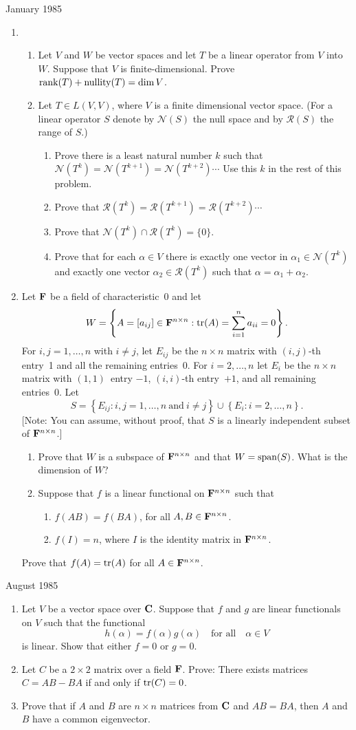 \documentclass[11pt]{amsart}
\renewcommand{\(}{\left(}
\renewcommand{\)}{\right)}
\renewcommand{\[}{\left[}
\renewcommand{\]}{\right]}
\newcommand{\cn}{\mbox{\bf C}}
\newcommand{\cd}{,\ldots,}
\newcommand{\tr}{\mathop{\rm Tr}}
\newcommand{\heading}[1]{\centerline{\large\sc #1}}
\newcommand{\num}{\begin{enumerate}}
\newcommand{\enum}{\end{enumerate}}
\newcommand{\fe}{{\bf F}}
\renewcommand{\tr}{\mathop{\rm tr}\nolimits}
\begin{document}
\heading{January 1985}
\num \item \num
\item Let $V$ and $W$ be vector spaces and let $T$ be a linear
operator from $V$ into $W$.  Suppose that $V$ is finite-dimensional.
Prove $\mathop{\rm rank}(T)+\mathop{\rm nullity}(T)=\dim V$.
\item  Let $T\in L(V,V)$, where $V$ is a finite dimensional vector space.
(For a linear operator $S$ denote by ${\mathcal N}(S)$ the null space and
by ${\mathcal R}(S)$ the range of $S$.)
\num
\item Prove there is a least natural number $k$ such that
${\mathcal N}(T^{k})= {\mathcal N}(T^{k+1})={\mathcal N}(T^{k+2})\cdots$  Use
this $k$ in the rest of this problem.
\item Prove that ${\mathcal R}(T^k)={\mathcal R}(T^{k+1})={\mathcal
R}(T^{k+2})\cdots$
\item Prove that ${\mathcal N}(T^k)\cap {\mathcal R}(T^k)=\{0\}$.
\item Prove that for each $\alpha\in V$ there is exactly one vector in
$\alpha_1\in{\mathcal N}(T^k)$ and exactly one vector $\alpha_2\in{\mathcal
R}(T^k)$ such that $\alpha=\alpha_1+\alpha_2$.
\enum
\enum
\item Let $\fe $ be a field of characteristic~0 and let 
$$
W=\left\{A=[a_{ij}]\in \fe^{n\times n}: \tr(A)=\sum_{i=1}^na_{ii}=0\right\}.
$$
For $i,j=1\cd n$ with $i\ne j$, let $E_{ij}$ be the $n\times n$ matrix
with $(i,j)$-th entry~1 and all the remaining entries~0.  For $i=2\cd
n$ let $E_{i}$ be the $n\times n$ matrix with $(1,1)$~entry $-1$,
$(i,i)$-th entry~$+1$, and all remaining entries~0.  Let
$$
S=\left\{E_{ij}: i,j=1\cd n\ \mbox{and}\ i\ne j\right\}\cup
\left\{E_{i}: i=2\cd n\right\}.
$$
[{\sc Note:} You can assume, without proof, that $S$ is a linearly
independent subset of $\fe^{n\times n}$.]
\num
\item Prove that $W$ is a subspace of $\fe^{n\times n}$ and that
$W=\mathop{\rm span}(S)$.  What is the dimension of $W$?
\item Suppose that $f$ is a linear functional on $\fe^{n\times n}$ such
that 
\num
\item $f(AB)=f(BA)$, for all $A,B\in \fe^{n\times n}$.
\item $f(I)=n$, where $I$ is the identity matrix in $\fe^{n\times n}$.
\enum
\enum
Prove that $f(A)=\tr(A)$ for all $A\in\fe^{n\times n}$.
\enum
\heading{August 1985}
\num
\item Let $V$ be a vector space over $\cn$.  Suppose that $f$ and $g$
are linear functionals on $V$ such that the functional
$$
h(\alpha)=f(\alpha)g(\alpha)\quad \mbox{for all}\quad \alpha\in V
$$
is linear.  Show that either $f=0$ or $g=0$.
\item Let $C$ be a $2\times2$ matrix over a field $\fe$.  Prove: There
exists matrices $C=AB-BA$ if and only if $\tr(C)=0$.
\item Prove that if $A$ and $B$ are $n\times n$ matrices from $\cn$ and
$AB=BA$, then $A$ and $B$ have a common eigenvector.
\enum
\end{document}
